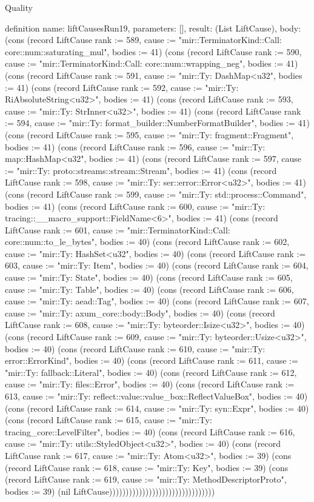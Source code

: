 \begin{lexlean}{Quality}
\begin{semanticmodule}
{}

definition{
  name: liftCausesRun19,
  parameters: [],
  result: (List LiftCause),
  body: (cons (record LiftCause {rank := 589, cause := "mir::TerminatorKind::Call: core::num::saturating_mul", bodies := 41}) (cons (record LiftCause {rank := 590, cause := "mir::TerminatorKind::Call: core::num::wrapping_neg", bodies := 41}) (cons (record LiftCause {rank := 591, cause := "mir::Ty: DashMap<u32", bodies := 41}) (cons (record LiftCause {rank := 592, cause := "mir::Ty: RiAbsoluteString<u32>", bodies := 41}) (cons (record LiftCause {rank := 593, cause := "mir::Ty: StrInner<u32>", bodies := 41}) (cons (record LiftCause {rank := 594, cause := "mir::Ty: format_builder::NumberFormatBuilder", bodies := 41}) (cons (record LiftCause {rank := 595, cause := "mir::Ty: fragment::Fragment", bodies := 41}) (cons (record LiftCause {rank := 596, cause := "mir::Ty: map::HashMap<u32", bodies := 41}) (cons (record LiftCause {rank := 597, cause := "mir::Ty: proto::streams::stream::Stream", bodies := 41}) (cons (record LiftCause {rank := 598, cause := "mir::Ty: ser::error::Error<u32>", bodies := 41}) (cons (record LiftCause {rank := 599, cause := "mir::Ty: std::process::Command", bodies := 41}) (cons (record LiftCause {rank := 600, cause := "mir::Ty: tracing::__macro_support::FieldName<6>", bodies := 41}) (cons (record LiftCause {rank := 601, cause := "mir::TerminatorKind::Call: core::num::to_le_bytes", bodies := 40}) (cons (record LiftCause {rank := 602, cause := "mir::Ty: HashSet<u32", bodies := 40}) (cons (record LiftCause {rank := 603, cause := "mir::Ty: Item", bodies := 40}) (cons (record LiftCause {rank := 604, cause := "mir::Ty: State", bodies := 40}) (cons (record LiftCause {rank := 605, cause := "mir::Ty: Table", bodies := 40}) (cons (record LiftCause {rank := 606, cause := "mir::Ty: aead::Tag", bodies := 40}) (cons (record LiftCause {rank := 607, cause := "mir::Ty: axum_core::body::Body", bodies := 40}) (cons (record LiftCause {rank := 608, cause := "mir::Ty: byteorder::Isize<u32>", bodies := 40}) (cons (record LiftCause {rank := 609, cause := "mir::Ty: byteorder::Usize<u32>", bodies := 40}) (cons (record LiftCause {rank := 610, cause := "mir::Ty: error::ErrorKind", bodies := 40}) (cons (record LiftCause {rank := 611, cause := "mir::Ty: fallback::Literal", bodies := 40}) (cons (record LiftCause {rank := 612, cause := "mir::Ty: files::Error", bodies := 40}) (cons (record LiftCause {rank := 613, cause := "mir::Ty: reflect::value::value_box::ReflectValueBox", bodies := 40}) (cons (record LiftCause {rank := 614, cause := "mir::Ty: syn::Expr", bodies := 40}) (cons (record LiftCause {rank := 615, cause := "mir::Ty: tracing_core::LevelFilter", bodies := 40}) (cons (record LiftCause {rank := 616, cause := "mir::Ty: utils::StyledObject<u32>", bodies := 40}) (cons (record LiftCause {rank := 617, cause := "mir::Ty: Atom<u32>", bodies := 39}) (cons (record LiftCause {rank := 618, cause := "mir::Ty: Key", bodies := 39}) (cons (record LiftCause {rank := 619, cause := "mir::Ty: MethodDescriptorProto", bodies := 39}) (nil LiftCause))))))))))))))))))))))))))))))))
}


\end{semanticmodule}
\end{lexlean}

